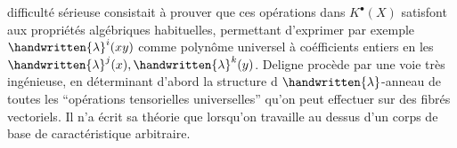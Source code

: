 {} difficulté sérieuse consistait à prouver que ces opérations dans $K^\bullet(X)$ satisfont aux propriétés algébriques habituelles, permettant d'exprimer par exemple $\handwritten{\lambda}^i(xy)$ comme polynôme universel à coéfficients entiers en les $\handwritten{\lambda}^j(x),\handwritten{\lambda}^k(y)$. Deligne procède par une voie très ingénieuse, en déterminant d'abord la structure d $\handwritten{\lambda}$-anneau de toutes les ``opérations tensorielles universelles'' qu'on peut effectuer sur des fibrés vectoriels. Il n'a écrit sa théorie que lorsqu'on travaille au dessus d'un corps de base \handwritten{(}de caractéristique arbitraire\handwritten{)}. 
